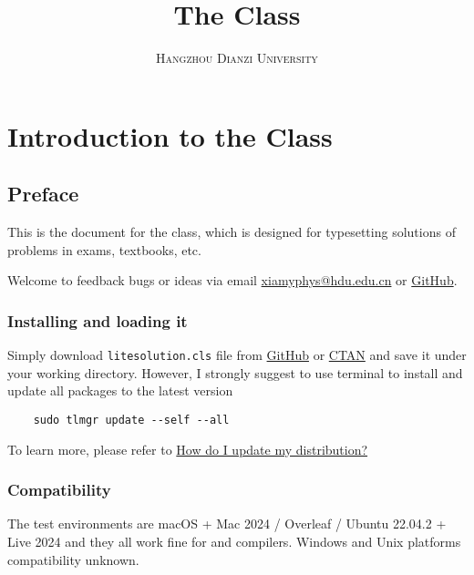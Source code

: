 \documentclass[mtpro2,twoside,openany]{litesolution}
\title{\sffamily The \pkg{LiteSolution} Class}
\subtitle{\sffamily\scshape Hangzhou Dianzi University}
\begin{document}
\maketitle[DarkSlateGray]
\frontmatter\tableofcontents\mainmatter
{}

\chapter{Introduction to the  Class}

\section{Preface}

This is the document for the  class, which is designed for typesetting solutions of problems in exams, textbooks, etc.

Welcome to feedback bugs or ideas via email \href{mailto:xiamyphys@hdu.edu.cn}{\ttfamily xiamyphys@hdu.edu.cn} or \href{https://github.com/xiamyphys/litesolution}{GitHub}.

\subsection{Installing  and loading it}

Simply download \verb|litesolution.cls| file from \href{https://github.com/xiamyphys/litesolution}{GitHub} or \href{https://ctan.org/pkg/litesolution}{CTAN} and save it under your working directory. However, I strongly suggest to use terminal to install and update all packages to the latest version

\begin{verbatim}
    sudo tlmgr update --self --all
\end{verbatim}

To learn more, please refer to \href{https://tex.stackexchange.com/questions/55437/how-do-i-update-my-tex-distribution}{How do I update my  distribution?}

\subsection{Compatibility}

The test environments are macOS + Mac 2024 / Overleaf / Ubuntu 22.04.2 +  Live 2024 and they all work fine for  and  compilers. Windows and Unix platforms compatibility unknown.
\end{document}
